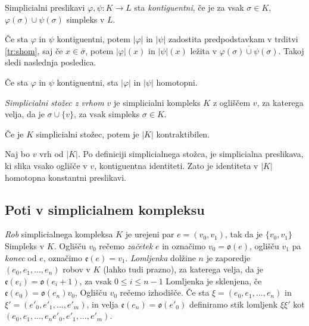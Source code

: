 \documentclass[mat1]{fmfdelo}
\begin{document}
\begin{definicija}
    Simplicialni preslikavi $\varphi, \psi:K\rightarrow L$ sta \textit{kontiguentni}, če je za vsak $\sigma \in K$, $\varphi(\sigma)\cup \psi(\sigma)$ simpleks v $L$.
\end{definicija}

Če sta $\varphi$ in $\psi$ kontiguentni, potem $|\varphi|$ in $|\psi|$ zadostita predpodstavkam v trditvi \ref{tr:shom}, saj če $x\in \overline{\sigma}$, potem $|\varphi|(x)$ in $|\psi|(x)$ ležita v $\overline{\varphi(\sigma)\cup\psi(\sigma)}$. Takoj sledi naslednja posledica.

\begin{posledica}
    Če sta $\varphi$ in $\psi$ kontiguentni, sta $|\varphi|$ in $|\psi|$ homotopni.
\end{posledica}

\textit{Simplicialni stožec z vrhom $v$} je simplicialni kompleks $K$ z ogliščem $v$, za katerega velja, da je $\sigma \cup \{v\}$, za vsak simpleks $\sigma\in K$.

\begin{posledica}
    Če je $K$ simplicialni stožec, potem je $|K|$ kontraktibilen.
    \label{pos:kontr}
\end{posledica}

\begin{dokaz}
    Naj bo $v$ vrh od $|K|$. Po definiciji simplicialnega stožca, je simplicialna preslikava, ki slika vsako oglišče v $v$, kontiguentna identiteti. Zato je identiteta v $|K|$ homotopna konstantni preslikavi.
\end{dokaz}

\subsection{Poti v simplicialnem kompleksu}

\textit{Rob} simplicialnega kompleksa $K$ je urejeni par $e=(v_0,v_1)$, tak da je $\{v_0,v_1\}$ Simpleks v $K$. Oglišču $v_0$ rečemo \textit{začetek} $e$ in označimo 
$v_0=\mathfrak{o}(e)$, oglišču $v_1$ pa \textit{konec} od $e$, 
označimo $\mathfrak{e}(e)=v_1$. \textit{Lomljenka} dolžine $n$ je zaporedje
$(e_0,e_1,...,e_{n})$ robov v $K$ (lahko tudi prazno), za katerega velja, da je $\mathfrak{e}(e_i)=\mathfrak{o}(e_i+1)$, za vsak $0\leq i \leq n-1$
Lomljenka je sklenjena, če $\mathfrak{e}(e_0)=\mathfrak{o}(e_n)v_0$, Oglišču $v_0$ rečemo izhodišče. Če sta $\xi =(e_0,e_1,...,e_n)$ in $\xi'=(e'_0,e'_1,...,e'_{m})$, in velja $\mathfrak{e}(e_n)=\mathfrak{o}(e'_0)$ definiramo stik lomljenk $\xi\xi'$ kot $(e_0,e_1,...,e_{n}e'_0,e'_1,...,e'_{m})$.
\end{document}
